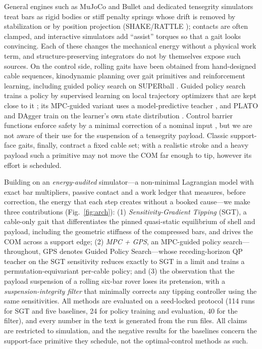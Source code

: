 \documentclass[letterpaper,10pt,conference]{IEEEtran}
\begin{document}
General engines such as MuJoCo and Bullet
\cite{todorov2012mujoco,coumans2015bullet} and dedicated tensegrity
simulators \cite{mirletz2015reality} treat bars as rigid bodies or stiff
penalty springs whose drift is removed by stabilization
\cite{baumgarte1972} or by position projection (SHAKE/RATTLE
\cite{ryckaert1977shake,andersen1983rattle}); contacts are often
clamped, and interactive simulators add ``assist'' torques so that a
gait looks convincing. Each of these changes the mechanical energy
without a physical work term, and structure-preserving integrators
\cite{hairer2006geometric} do not by themselves expose such sources.
On the control side, rolling gaits have been obtained from hand-designed
cable sequences, kinodynamic planning over gait primitives
\cite{littlefield2019kinodynamic} and reinforcement learning, including
guided policy search on SUPERball \cite{zhang2017deep}. Guided policy
search trains a policy by supervised learning on local trajectory
optimizers that are kept close to it \cite{levine2013guided,
montgomery2016mdgps}; its MPC-guided variant uses a model-predictive
teacher \cite{zhang2016mpcgps}, and PLATO and DAgger train on the
learner's own state distribution \cite{kahn2017plato,ross2011dagger}.
Control barrier functions enforce safety by a minimal correction of a
nominal input \cite{ames2017cbf,agrawal2017dcbf}, but we are not aware
of their use for the suspension of a tensegrity payload. Classic
support-face gaits, finally, contract a fixed cable set; with a
realistic stroke and a heavy payload such a primitive may not move the
COM far enough to tip, however its effort is scheduled.

Building on an \emph{energy-audited} simulator---a non-minimal
Lagrangian model \cite{nonminimal_preprint} with exact bar multipliers,
passive contact and a work ledger that measures, before correction, the
energy that each step creates without a booked cause---we make three
contributions (Fig.~\ref{fig:arch}): (1) \emph{Sensitivity-Gradient
Tipping} (SGT), a cable-only gait that differentiates the pinned
quasi-static equilibrium of shell and payload, including the geometric
stiffness of the compressed bars, and drives the COM across a support
edge; (2) \emph{MPC + GPS}, an MPC-guided policy search---throughout,
GPS denotes Guided Policy Search---whose receding-horizon QP teacher on
the SGT sensitivity reduces exactly to SGT in a limit and trains a
permutation-equivariant per-cable policy; and (3) the observation that
the payload suspension of a rolling six-bar rover loses its pretension,
with a \emph{suspension-integrity filter} that minimally corrects any
tipping controller using the same sensitivities. All methods are
evaluated on a seed-locked protocol (114 runs for SGT and five
baselines, 24 for policy training and evaluation, 40 for the filter),
and every number in the text is generated from the run files. All
claims are restricted to simulation, and the negative results for the
baselines concern the support-face primitive they schedule, not the
optimal-control methods as such.
\end{document}
